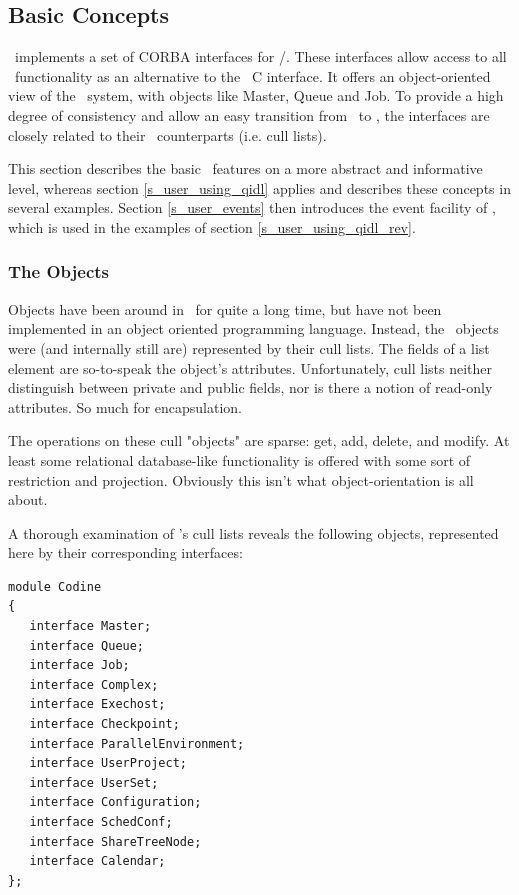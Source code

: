 
\subsection{Basic Concepts}
\qidl\ implements a set of CORBA interfaces for \codine/\GRD. These interfaces
allow access to all \GRD\ functionality as an alternative to the \codapi\ C
interface. It offers an object-oriented view of the \GRD\ system, with objects
like Master, Queue and Job. To provide a high degree of consistency and allow
an easy transition from \codapi\ to \qidl, the interfaces 
are closely related to their \codapi\ counterparts (i.e. cull lists).

This section describes the basic \qidl\ features on a more abstract and
informative level, whereas section \ref{s_user_using_qidl} applies and
describes these concepts in several examples. Section \ref{s_user_events} then
introduces the event facility of \qidl, which is used in the examples of
section \ref{s_user_using_qidl_rev}.

\subsubsection{\label{s_user_objects}The Objects}
Objects have been around in \codine\ for quite a long time, but have not been
implemented in an object oriented programming language. Instead, the
\codine\ objects were (and internally still are) represented
by their cull lists. The fields of a list element are so-to-speak the
object's attributes. Unfortunately, cull lists neither distinguish between
private and public fields, nor is there a notion of read-only attributes.
So much for encapsulation.

The operations on these cull "objects" are sparse: get, add, delete, and
modify. At least some relational database-like functionality is offered with
some sort of restriction and projection. Obviously this isn't what
object-orientation is all about.

A thorough examination of \codine's cull lists reveals the following objects,
represented here by their corresponding interfaces:

\begin{Verbatim}[fontsize=\small, frame=single]
module Codine
{
   interface Master;
   interface Queue;
   interface Job;
   interface Complex;
   interface Exechost;
   interface Checkpoint;
   interface ParallelEnvironment;
   interface UserProject;
   interface UserSet;
   interface Configuration;
   interface SchedConf;
   interface ShareTreeNode;
   interface Calendar;
};
\end{Verbatim}

